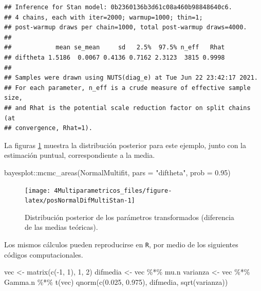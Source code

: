 \documentclass[
  10pt,
  spanish,
]{book}
\newenvironment{Shaded}{\begin{snugshade}}{\end{snugshade}}
\newcommand{\AttributeTok}[1]{\textcolor[rgb]{0.77,0.63,0.00}{#1}}
\newcommand{\DecValTok}[1]{\textcolor[rgb]{0.00,0.00,0.81}{#1}}
\newcommand{\FloatTok}[1]{\textcolor[rgb]{0.00,0.00,0.81}{#1}}
\newcommand{\FunctionTok}[1]{\textcolor[rgb]{0.00,0.00,0.00}{#1}}
\newcommand{\NormalTok}[1]{#1}
\newcommand{\OtherTok}[1]{\textcolor[rgb]{0.56,0.35,0.01}{#1}}
\newcommand{\SpecialCharTok}[1]{\textcolor[rgb]{0.00,0.00,0.00}{#1}}
\newcommand{\StringTok}[1]{\textcolor[rgb]{0.31,0.60,0.02}{#1}}
\theoremstyle{definition}
\theoremstyle{definition}
\theoremstyle{definition}
\theoremstyle{definition}
\theoremstyle{remark}
\begin{document}
\begin{verbatim}
## Inference for Stan model: 0b2360136b3d61c08a460b98848640c6.
## 4 chains, each with iter=2000; warmup=1000; thin=1; 
## post-warmup draws per chain=1000, total post-warmup draws=4000.
## 
##            mean se_mean     sd   2.5%  97.5% n_eff   Rhat
## diftheta 1.5186  0.0067 0.4136 0.7162 2.3123  3815 0.9998
## 
## Samples were drawn using NUTS(diag_e) at Tue Jun 22 23:42:17 2021.
## For each parameter, n_eff is a crude measure of effective sample size,
## and Rhat is the potential scale reduction factor on split chains (at 
## convergence, Rhat=1).
\end{verbatim}

La figuras \ref{fig:posNormalDifMultiStan} muestra la distribución posterior para este ejemplo, junto con la estimación puntual, correspondiente a la media.

\begin{Shaded}
\begin{Highlighting}[]
\NormalTok{bayesplot}\SpecialCharTok{::}\FunctionTok{mcmc\_areas}\NormalTok{(NormalMultifit, }\AttributeTok{pars =} \StringTok{"diftheta"}\NormalTok{, }
                      \AttributeTok{prob =} \FloatTok{0.95}\NormalTok{)}
\end{Highlighting}
\end{Shaded}

\begin{figure}

{\centering \texttt{[image: 4Multiparametricos\_files/figure-latex/posNormalDifMultiStan-1]} 

}

\caption{Distribución posterior de los parámetros transformados (diferencia de las medias teóricas).}\label{fig:posNormalDifMultiStan}
\end{figure}

Los mismos cálculos pueden reproducirse en \texttt{R}, por medio de los siguientes códigos computacionales.

\begin{Shaded}
\begin{Highlighting}[]
\NormalTok{vec }\OtherTok{\textless{}{-}} \FunctionTok{matrix}\NormalTok{(}\FunctionTok{c}\NormalTok{(}\SpecialCharTok{{-}}\DecValTok{1}\NormalTok{, }\DecValTok{1}\NormalTok{), }\DecValTok{1}\NormalTok{, }\DecValTok{2}\NormalTok{)}
\NormalTok{difmedia }\OtherTok{\textless{}{-}}\NormalTok{ vec }\SpecialCharTok{\%*\%}\NormalTok{ mu.n}
\NormalTok{varianza }\OtherTok{\textless{}{-}}\NormalTok{ vec }\SpecialCharTok{\%*\%}\NormalTok{ Gamma.n }\SpecialCharTok{\%*\%} \FunctionTok{t}\NormalTok{(vec)}
\FunctionTok{qnorm}\NormalTok{(}\FunctionTok{c}\NormalTok{(}\FloatTok{0.025}\NormalTok{, }\FloatTok{0.975}\NormalTok{), difmedia, }\FunctionTok{sqrt}\NormalTok{(varianza))}
\end{Highlighting}
\end{Shaded}
\end{document}
